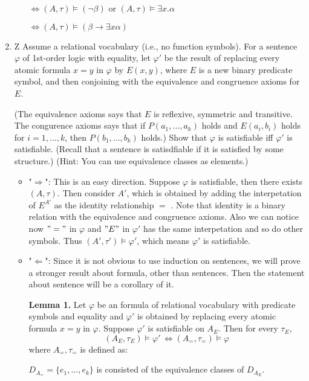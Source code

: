 \documentclass[12pt]{article}
\renewcommand{\phi}{\varphi}
\begin{document}
\begin{enumerate}
\begin{enumerate}
				$\Leftrightarrow (A,\tau)\models(\neg \beta)$ or $(A,\tau)\models\exists x.\alpha$	
				
					$\Leftrightarrow (A,\tau)\models (\beta\to\exists x\alpha)$
		\end{enumerate}
		\item
		Z Assume a relational vocabulary (i.e., no function symbols).
		For a sentence $\phi$ of 1st-order logic with equality,
		let $\phi'$ be the result of replacing every atomic formula
		$x=y$ in $\phi$ by $E(x,y)$, where $E$ is a new binary predicate
		symbol, and then conjoining with the equivalence and congruence
		axioms for $E$.
		
	
		
		(The equivalence axioms says that $E$ is reflexive, symmetric and
		transitive. The congurence axioms says that
		if $P(a_1,\ldots,a_k)$ holds and $E(a_i,b_i)$ holds
		for $i=1,\ldots,k$, then $P(b_1,\ldots,b_k)$ holds.)
		Show that $\phi$ is satisfiable iff $\phi'$ is satisfiable.
		(Recall that a sentence is satisdfiable if it is satisfied by some
		structure.) (Hint: You can use equivalence classes as elements.)
		
		
			\begin{itemize}
			\item "$\Rightarrow$": This is an easy direction. Suppose $\phi$ is satisfiable, then there exists $(A,\tau)$. Then consider  $A'$, which is obtained by adding the interpetation of $E^{A'}$ as the identity relationship $=$ . Note that identity is a binary relation with the equivalence and congruence axioms.  Also we can notice now $"="$ in $\phi$ and $"E"$ in $\phi'$ has the same interpetation  and so do other symbols. Thus $(A',\tau')\models \phi'$, which means $\phi'$ is satisfiable.
			\item "$\Leftarrow$": Since it is not obvious to use induction on sentences, we will prove a stronger result about formula, other than sentences. Then  the statement about sentence will be a corollary of it.
			
			\textbf{Lemma 1.} Let $\phi$ be an formula of relational vocabulary with predicate symbols and equality and $\phi'$ is obtained by replacing every atomic formula $x=y$ in $\phi$.
			Suppose $\phi'$ is satisfiable on $A_E$. Then for every $\tau_E$, 
			  $$(A_E,\tau_E)\models \phi'\, \Leftrightarrow (A_{=},\tau_=)\models\phi$$
			  where $A_{=},\tau_=$ is defined as:
			
			$D_{A_=}=\{e_1,...,e_k\}$ is consisted of the equivalence classes of $D_{A_E}$.
			

\end{itemize}
\end{enumerate}
\end{document}
